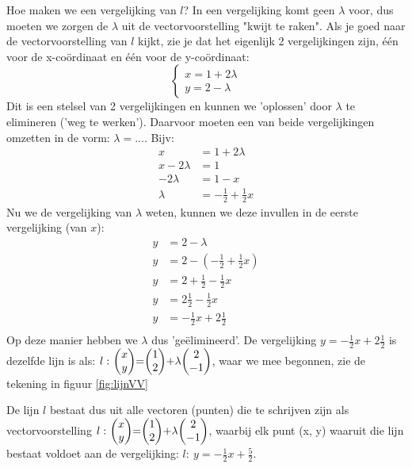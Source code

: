 Hoe maken we een vergelijking van  $ l $? In een vergelijking komt geen $ \lambda $ voor, dus moeten we zorgen de $ \lambda $ uit de vectorvoorstelling "kwijt te raken". Als je goed naar de vectorvoorstelling van $ l $ kijkt, zie je dat het eigenlijk 2 vergelijkingen zijn, één voor de x-coördinaat en één voor de y-coördinaat:
\[\begin{cases}
x = 1 + 2\lambda\\
y = 2 - \lambda 
\end{cases}
\] 
Dit is een stelsel van 2 vergelijkingen  en kunnen we 'oplossen' door $ \lambda $ te elimineren ('weg te werken'). Daarvoor moeten een van beide vergelijkingen omzetten in de vorm: $\lambda = ...$. Bijv:
\begin{align*}
  x & = 1 + 2\lambda \\
  x - 2\lambda &= 1 \\
  -2\lambda &= 1 - x \\
  \lambda &= -\frac{1}{2} + \frac{1}{2}x
\end{align*}
Nu we de vergelijking van $\lambda$ weten, kunnen we deze invullen in de eerste vergelijking (van $x$):
\begin{align*}
  y &= 2 - \lambda \\
  y &= 2 - (-\frac{1}{2} + \frac{1}{2}x) \\
  y &= 2 + \frac{1}{2} - \frac{1}{2}x \\
  y &= 2\frac{1}{2} - \frac{1}{2}x \\
  y &= -\frac{1}{2}x + 2\frac{1}{2} \\
\end{align*}
Op deze manier hebben we $\lambda$ dus 'geëlimineerd'. De vergelijking  $ y = -\frac{1}{2}x + 2\frac{1}{2} $  is dezelfde lijn is als: $ l: \ \vectwee {x}{y} = \vectwee {1}{2} + \lambda  \vectwee {2}{-1}  $, waar we mee begonnen, zie de tekening in  figuur  \ref{fig:lijnVV}


\newpage
De lijn $l$ bestaat dus uit alle vectoren (punten) die te schrijven zijn als vectorvoorstelling $ l: \ \vectwee {x}{y} = \vectwee {1}{2} + \lambda  \vectwee {2}{-1}  $, waarbij elk punt (x, y) waaruit die lijn bestaat voldoet aan de vergelijking: $ l:  \ y = - \frac{1}{2}x + \frac{5}{2} $.

